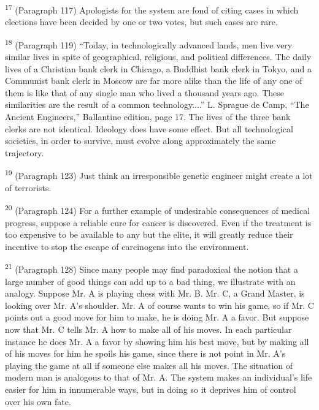 \documentclass{article}
\begin{document}
\textsuperscript{17} (Paragraph 117) Apologists for the system are fond of citing cases in which elections have 
been decided by one or two votes, but such cases are rare. \vspace{\baselineskip}

\textsuperscript{18} (Paragraph 119) “Today, in technologically advanced lands, men live very similar lives in spite 
of geographical, religious, and political differences. The daily lives of a Christian bank clerk in 
Chicago, a Buddhist bank clerk in Tokyo, and a Communist bank clerk in Moscow are far more 
alike than the life of any one of them is like that of any single man who lived a thousand years 
ago. These similarities are the result of a common technology....” L. Sprague de Camp, “The 
Ancient Engineers,” Ballantine edition, page 17. The lives of the three bank clerks are not 
identical. Ideology does have some effect. But all technological societies, in order to survive, 
must evolve along approximately the same trajectory. \vspace{\baselineskip}

\textsuperscript{19} (Paragraph 123) Just think an irresponsible genetic engineer might create a lot of terrorists. \vspace{\baselineskip}

\textsuperscript{20} (Paragraph 124) For a further example of undesirable consequences of medical progress, 
suppose a reliable cure for cancer is discovered. Even if the treatment is too expensive to be 
available to any but the elite, it will greatly reduce their incentive to stop the escape of 
carcinogens into the environment. \vspace{\baselineskip}

\textsuperscript{21} (Paragraph 128) Since many people may find paradoxical the notion that a large number of 
good things can add up to a bad thing, we illustrate with an analogy. Suppose Mr. A is playing 
chess with Mr. B. Mr. C, a Grand Master, is looking over Mr. A’s shoulder. Mr. A of course 
wants to win his game, so if Mr. C points out a good move for him to make, he is doing Mr. A a 
favor. But suppose now that Mr. C tells Mr. A how to make all of his moves. In each 
particular instance he does Mr. A a favor by showing him his best move, but by making all of 
his moves for him he spoils his game, since there is not point in Mr. A’s playing the game at all 
if someone else makes all his moves. The situation of modern man is analogous to that of 
Mr. A. The system makes an individual’s life easier for him in innumerable ways, but in doing 
so it deprives him of control over his own fate. \vspace{\baselineskip}
\end{document}
